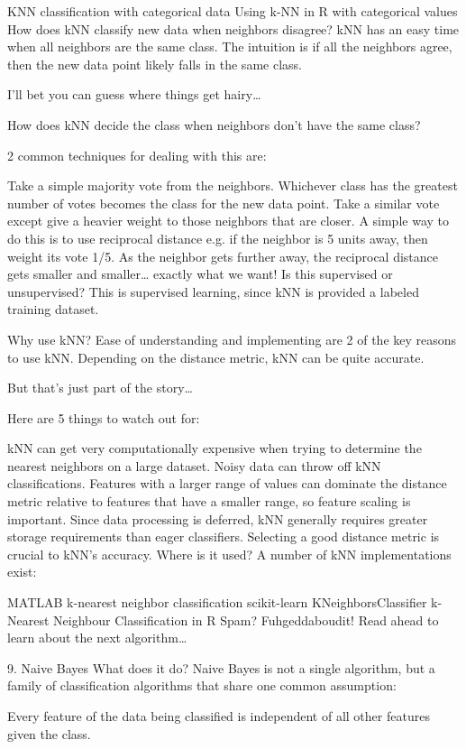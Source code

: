 KNN classification with categorical data
Using k-NN in R with categorical values
How does kNN classify new data when neighbors disagree? kNN has an easy time when all neighbors are the same class. The intuition is if all the neighbors agree, then the new data point likely falls in the same class.

I’ll bet you can guess where things get hairy…

How does kNN decide the class when neighbors don’t have the same class?

2 common techniques for dealing with this are:

Take a simple majority vote from the neighbors. Whichever class has the greatest number of votes becomes the class for the new data point.
Take a similar vote except give a heavier weight to those neighbors that are closer. A simple way to do this is to use reciprocal distance e.g. if the neighbor is 5 units away, then weight its vote 1/5. As the neighbor gets further away, the reciprocal distance gets smaller and smaller… exactly what we want!
Is this supervised or unsupervised? This is supervised learning, since kNN is provided a labeled training dataset.

Why use kNN? Ease of understanding and implementing are 2 of the key reasons to use kNN. Depending on the distance metric, kNN can be quite accurate.

But that’s just part of the story…

Here are 5 things to watch out for:

kNN can get very computationally expensive when trying to determine the nearest neighbors on a large dataset.
Noisy data can throw off kNN classifications.
Features with a larger range of values can dominate the distance metric relative to features that have a smaller range, so feature scaling is important.
Since data processing is deferred, kNN generally requires greater storage requirements than eager classifiers.
Selecting a good distance metric is crucial to kNN’s accuracy.
Where is it used? A number of kNN implementations exist:

MATLAB k-nearest neighbor classification
scikit-learn KNeighborsClassifier
k-Nearest Neighbour Classification in R
Spam? Fuhgeddaboudit! Read ahead to learn about the next algorithm…

9. Naive Bayes
What does it do? Naive Bayes is not a single algorithm, but a family of classification algorithms that share one common assumption:

Every feature of the data being classified is independent of all other features given the class.

